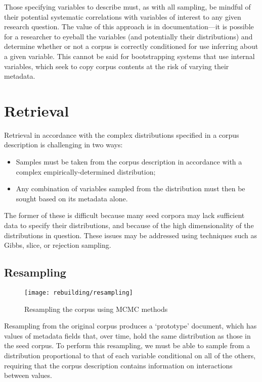 Those specifying variables to describe must, as with all sampling, be mindful of their potential systematic correlations with variables of interest to any given research question.  The value of this approach is in documentation---it is possible for a researcher to eyeball the variables (and potentially their distributions) and determine whether or not a corpus is correctly conditioned for use inferring about a given variable.  This cannot be said for bootstrapping systems that use internal variables, which seek to copy corpus contents at the risk of varying their metadata.



\section{Retrieval}
Retrieval in accordance with the complex distributions specified in a corpus description is challenging in two ways:

\begin{itemize}
    \item Samples must be taken from the corpus description in accordance with a complex empirically-determined distribution;
    \item Any combination of variables sampled from the distribution must then be sought based on its metadata alone.
\end{itemize}

The former of these is difficult because many seed corpora may lack sufficient data to specify their distributions, and because of the high dimensionality of the distributions in question.  These issues may be addressed using techniques such as Gibbs, slice, or rejection sampling.  



\subsection{Resampling}

\begin{figure}[h]
    \centering
    \texttt{[image: rebuilding/resampling]}
    \caption{Resampling the corpus using MCMC methods}
    \label{fig:rebuilding:resampling}
\end{figure}



Resampling from the original corpus produces a `prototype' document, which has values of metadata fields that, over time, hold the same distribution as those in the seed corpus.  To perform this resampling, we must be able to sample from a distribution proportional to that of each variable conditional on all of the others, requiring that the corpus description contains information on interactions between values.

